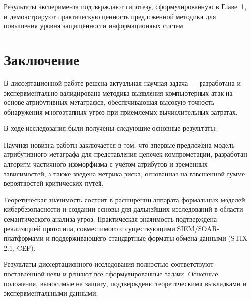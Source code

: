 \documentclass{article}
\begin{document}
Результаты эксперимента подтверждают гипотезу, сформулированную в Главе~1, и демонстрируют практическую ценность предложенной методики для повышения уровня защищённости информационных систем.


\chapter*{Заключение}                       %





В диссертационной работе решена актуальная научная задача — разработана и экспериментально валидирована методика выявления компьютерных атак на основе атрибутивных метаграфов, обеспечивающая высокую точность обнаружения многоэтапных угроз при приемлемых вычислительных затратах.

В ходе исследования были получены следующие основные результаты:



Научная новизна работы заключается в том, что впервые предложена модель атрибутивного метаграфа для представления цепочек компрометации, разработан алгоритм частичного изоморфизма с учётом атрибутов и временных зависимостей, а также введена метрика риска, основанная на взвешенной сумме вероятностей критических путей.

Теоретическая значимость состоит в расширении аппарата формальных моделей кибербезопасности и создании основы для дальнейших исследований в области семантического анализа угроз. Практическая значимость подтверждена реализацией прототипа, совместимого с существующими SIEM/SOAR-платформами и поддерживающего стандартные форматы обмена данными (STIX 2.1, CEF).

Результаты диссертационного исследования полностью соответствуют поставленной цели и решают все сформулированные задачи. Основные положения, выносимые на защиту, подтверждены теоретическими выкладками и экспериментальными данными.
\end{document}
